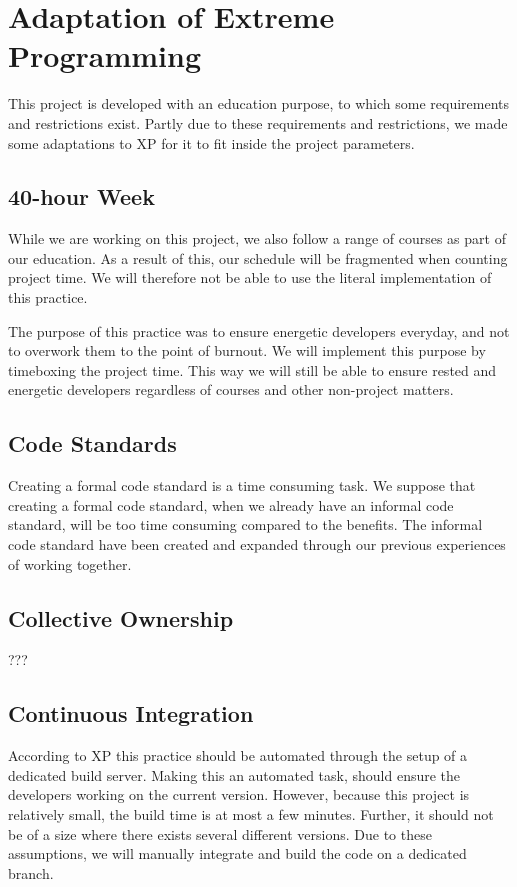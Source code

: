 \section{Adaptation of Extreme Programming}
This project is developed with an education purpose, to which some requirements and restrictions exist.
Partly due to these requirements and restrictions, we made some adaptations to XP for it to fit inside the project parameters.

\subsection{40-hour Week}
While we are working on this project, we also follow a range of courses as part of our education.
As a result of this, our schedule will be fragmented when counting project time.
We will therefore not be able to use the literal implementation of this practice.

The purpose of this practice was to ensure energetic developers everyday, and not to overwork them to the point of burnout.
We will implement this purpose by timeboxing the project time.
This way we will still be able to ensure rested and energetic developers regardless of courses and other non-project matters.

\subsection{Code Standards}
Creating a formal code standard is a time consuming task.
We suppose that creating a formal code standard, when we already have an informal code standard, will be too time consuming compared to the benefits.
The informal code standard have been created and expanded through our previous experiences of working together.

\subsection{Collective Ownership}
???

\subsection{Continuous Integration}
According to XP this practice should be automated through the setup of a dedicated build server.
Making this an automated task, should ensure the developers working on the current version.
However, because this project is relatively small, the build time is at most a few minutes.
Further, it should not be of a size where there exists several different versions.
Due to these assumptions, we will manually integrate and build the code on a dedicated branch.

